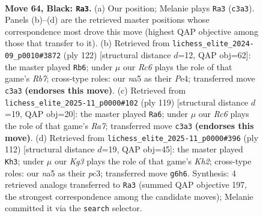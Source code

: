 \documentclass[11pt]{article}
\begin{document}
\clearpage

\begin{figure}[p]\centering
\begin{subfigure}{0.46\textwidth}\centering
\resizebox{\linewidth}{!}{%
\newchessgame
\chessboard[
  setfen={8/3R2p1/5pk1/N6p/3P3P/2r3PK/8/8 b - - 22 64},
  showmover=false,
  pgfstyle=straightmove, color=movearrow, markmove={c3-a3}
]}
\caption{}
\end{subfigure}\hfill
\begin{subfigure}{0.46\textwidth}\centering
\resizebox{\linewidth}{!}{%
\newchessgame
\chessboard[
  setfen={8/1R3pk1/6p1/7p/4P2P/5PK1/6P1/7r w - - 9 62},
  showmover=false,
  pgfstyle=straightmove, color=movearrow, markmove={b7-b6}
]}
\caption{}
\end{subfigure}
\\[4pt]
\begin{subfigure}{0.46\textwidth}\centering
\resizebox{\linewidth}{!}{%
\newchessgame
\chessboard[
  setfen={1R6/5p2/5Pk1/6p1/7p/7P/r5PK/8 b - - 1 60},
  showmover=false,
  pgfstyle=straightmove, color=movearrow, markmove={a2-a6}
]}
\caption{}
\end{subfigure}\hfill
\begin{subfigure}{0.46\textwidth}\centering
\resizebox{\linewidth}{!}{%
\newchessgame
\chessboard[
  setfen={8/4kp2/R5p1/4P2p/5P2/2p3P1/2r3PK/8 w - - 0 57},
  showmover=false,
  pgfstyle=straightmove, color=movearrow, markmove={h2-h3}
]}
\caption{}
\end{subfigure}
\caption{\textbf{Move 64, Black: \texttt{Ra3}.} (a) Our position; Melanie plays \texttt{Ra3} (\texttt{c3a3}). Panels (b)--(d) are the retrieved master positions whose correspondence most drove this move (highest QAP objective among those that transfer to it). (b) Retrieved from \texttt{lichess\_elite\_2024-09\_p0010\#3872} (ply 122) [structural distance $d$=12, QAP obj=62]: the master played \texttt{Rb6}; under $\mu$ our \emph{Rc6} plays the role of that game's \emph{Rb7}; cross-type roles: our \emph{n}a5 as their \emph{P}e4; transferred move \texttt{c3a3} \textbf{(endorses this move)}. (c) Retrieved from \texttt{lichess\_elite\_2025-11\_p0000\#102} (ply 119) [structural distance $d$=19, QAP obj=20]: the master played \texttt{Ra6}; under $\mu$ our \emph{Rc6} plays the role of that game's \emph{Ra7}; transferred move \texttt{c3a3} \textbf{(endorses this move)}. (d) Retrieved from \texttt{lichess\_elite\_2025-11\_p0000\#396} (ply 112) [structural distance $d$=19, QAP obj=45]: the master played \texttt{Kh3}; under $\mu$ our \emph{Kg3} plays the role of that game's \emph{Kh2}; cross-type roles: our \emph{n}a5 as their \emph{p}c3; transferred move \texttt{g6h6}. Synthesis: 4 retrieved analogs transferred to \texttt{Ra3} (summed QAP objective 197, the strongest correspondence among the candidate moves); Melanie committed it via the \texttt{search} selector.}
\label{fig:thought-m127}
\end{figure}
\end{document}
